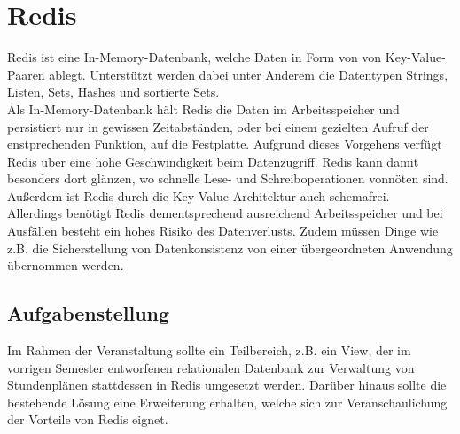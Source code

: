 
\section{Redis}
Redis ist eine In-Memory-Datenbank, welche Daten in Form von von Key-Value-Paaren ablegt. Unterstützt werden dabei unter Anderem die Datentypen Strings, Listen, Sets, Hashes
und sortierte Sets.\\
Als In-Memory-Datenbank hält Redis die Daten im Arbeitsspeicher und persistiert nur in gewissen Zeitabständen, oder bei einem gezielten Aufruf der enstprechenden Funktion, auf die
Festplatte. Aufgrund dieses Vorgehens verfügt Redis über eine hohe Geschwindigkeit beim Datenzugriff. Redis kann damit besonders dort glänzen, wo schnelle Lese- und
Schreiboperationen vonnöten sind. Außerdem ist Redis durch die Key-Value-Architektur auch schemafrei.\\
Allerdings benötigt Redis dementsprechend ausreichend Arbeitsspeicher und bei Ausfällen besteht ein hohes Risiko des Datenverlusts. Zudem müssen Dinge wie z.B. die Sicherstellung
von Datenkonsistenz von einer übergeordneten Anwendung übernommen werden.
\subsection{Aufgabenstellung}
Im Rahmen der Veranstaltung sollte ein Teilbereich, z.B. ein View, der im vorrigen Semester entworfenen relationalen Datenbank zur Verwaltung von Stundenplänen
stattdessen in Redis umgesetzt werden. Darüber hinaus sollte die bestehende Lösung eine Erweiterung erhalten, welche sich zur Veranschaulichung der Vorteile von Redis
eignet.

